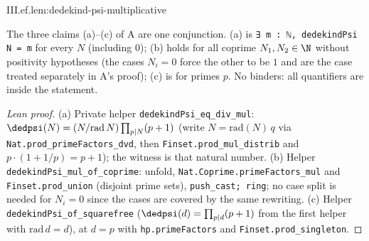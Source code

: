 \begin{lemma}
\end{lemma}
\begin{tfformal}{III.ef.lem:dedekind-psi-multiplicative}
\begin{tffidelity}
The three claims (a)--(c) of A are one conjunction. (a) is \texttt{∃ m : ℕ, dedekindPsi N = m} for every $N$ (including $0$); (b) holds for all coprime $N_1,N_2\in\N$ without positivity hypotheses (the cases $N_i=0$ force the other to be $1$ and are the case treated separately in A's proof); (c) is for primes $p$. No binders: all quantifiers are inside the statement.
\end{tffidelity}
\end{tfformal}
\begin{proof}[Lean proof]
(a) Private helper \texttt{dedekindPsi\_eq\_div\_mul}: $\dedpsi(N)=(N/\mathrm{rad}\,N)\prod_{p\mid N}(p+1)$ (write $N=\mathrm{rad}(N)\,q$ via \texttt{Nat.prod\_primeFactors\_dvd}, then \texttt{Finset.prod\_mul\_distrib} and $p\cdot(1+1/p)=p+1$); the witness is that natural number. (b) Helper \texttt{dedekindPsi\_mul\_of\_coprime}: unfold, \texttt{Nat.Coprime.primeFactors\_mul} and \texttt{Finset.prod\_union} (disjoint prime sets), \texttt{push\_cast; ring}; no case split is needed for $N_i=0$ since the cases are covered by the same rewriting. (c) Helper \texttt{dedekindPsi\_of\_squarefree} ($\dedpsi(d)=\prod_{p\mid d}(p+1)$ from the first helper with $\mathrm{rad}\,d=d$), at $d=p$ with \texttt{hp.primeFactors} and \texttt{Finset.prod\_singleton}.
\end{proof}

